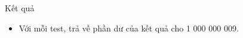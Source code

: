 Kết quả  
\begin{itemize}
	\item     Với mỗi test, trả về phần dư của kết quả cho 1 000 000 009.   
\end{itemize}
